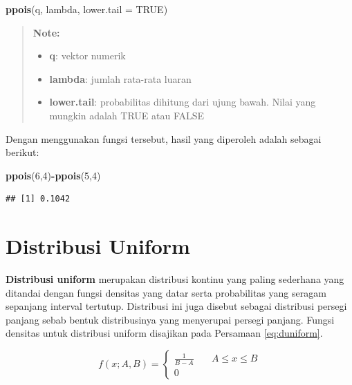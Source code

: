 \documentclass[]{book}
\newenvironment{Shaded}{\begin{snugshade}}{\end{snugshade}}
\newcommand{\KeywordTok}[1]{\textcolor[rgb]{0.13,0.29,0.53}{\textbf{#1}}}
\newcommand{\DataTypeTok}[1]{\textcolor[rgb]{0.13,0.29,0.53}{#1}}
\newcommand{\DecValTok}[1]{\textcolor[rgb]{0.00,0.00,0.81}{#1}}
\newcommand{\OtherTok}[1]{\textcolor[rgb]{0.56,0.35,0.01}{#1}}
\newcommand{\OperatorTok}[1]{\textcolor[rgb]{0.81,0.36,0.00}{\textbf{#1}}}
\newcommand{\NormalTok}[1]{#1}
\providecommand{\tightlist}{%
  \setlength{\itemsep}{0pt}\setlength{\parskip}{0pt}}
\begin{document}
\begin{Shaded}
\begin{Highlighting}[]
\KeywordTok{ppois}\NormalTok{(q, lambda, }\DataTypeTok{lower.tail =} \OtherTok{TRUE}\NormalTok{)}
\end{Highlighting}
\end{Shaded}

\begin{quote}
\textbf{Note: }

\begin{itemize}
\tightlist
\item
  \textbf{q}: vektor numerik
\item
  \textbf{lambda}: jumlah rata-rata luaran
\item
  \textbf{lower.tail}: probabilitas dihitung dari ujung bawah. Nilai
  yang mungkin adalah TRUE atau FALSE
\end{itemize}
\end{quote}

Dengan menggunakan fungsi tersebut, hasil yang diperoleh adalah sebagai
berikut:

\begin{Shaded}
\begin{Highlighting}[]
\KeywordTok{ppois}\NormalTok{(}\DecValTok{6}\NormalTok{,}\DecValTok{4}\NormalTok{)}\OperatorTok{-}\KeywordTok{ppois}\NormalTok{(}\DecValTok{5}\NormalTok{,}\DecValTok{4}\NormalTok{)}
\end{Highlighting}
\end{Shaded}

\begin{verbatim}
## [1] 0.1042
\end{verbatim}

\section{Distribusi Uniform}\label{distribusi-uniform}

\textbf{Distribusi uniform} merupakan distribusi kontinu yang paling
sederhana yang ditandai dengan fungsi densitas yang datar serta
probabilitas yang seragam sepanjang interval tertutup. Distribusi ini
juga disebut sebagai distribusi persegi panjang sebab bentuk
distribusinya yang menyerupai persegi panjang. Fungsi densitas untuk
distribusi uniform disajikan pada Persamaan \eqref{eq:duniform}.

\begin{equation}
f(x;A,B) =
  \begin{cases}
    \frac{1}{B-A}       & \quad A\le x\le B\\
    0                   & \quad\text{}
    \end{cases}
 \label{eq:duniform}
\end{equation}
\end{document}
